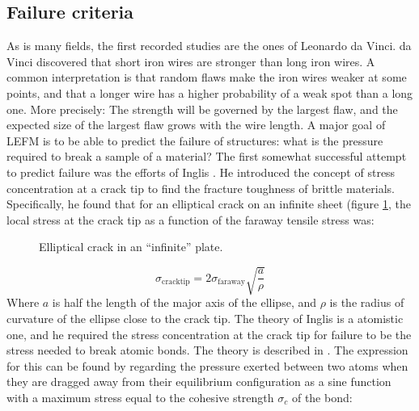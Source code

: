 \subsection{Failure criteria}
As is many fields, the first recorded studies are the ones of Leonardo da Vinci. da Vinci discovered that short iron wires are stronger than long iron wires. A common interpretation is that random flaws make the iron wires weaker at some points, and that a longer wire has a higher probability of a weak spot than a long one. More precisely: The strength will be governed by the largest flaw, and the expected size of the largest flaw grows with the wire length. A major goal of LEFM is to be able to predict the failure of structures: what is the pressure required to break a sample of a material? The first somewhat successful attempt to predict failure was the efforts of Inglis \cite{inglis1913stresses}. He introduced the concept of stress concentration at a crack tip to find the fracture toughness of brittle materials. Specifically, he found that for an elliptical crack on an infinite sheet (figure \ref{fig:elliptical_crack}, the local stress at the crack tip as a function of the faraway tensile stress was:
\begin{figure}
\centering
{}
\caption{Elliptical crack in an ``infinite'' plate.}
\label{fig:elliptical_crack}
\end{figure}
\begin{equation}
	\sigma_{\text{cracktip}} = 2\sigma_{\text{faraway}}\sqrt{\frac{a}{\rho}}
	\label{eq:stress_consentration}
\end{equation}
Where $a$ is half the length of the major axis of the ellipse, and $\rho$ is the radius of curvature of the ellipse close to the crack tip. The theory of Inglis is a atomistic one, and he required the stress concentration at the crack tip for failure to be the stress needed to break atomic bonds. The theory is described in \citet[p.27]{Anderson2005}. The expression for this can be found by regarding the pressure exerted between two atoms when they are dragged away from their equilibrium configuration as a sine function with a maximum stress equal to the cohesive strength $\sigma_c$ of the bond:
